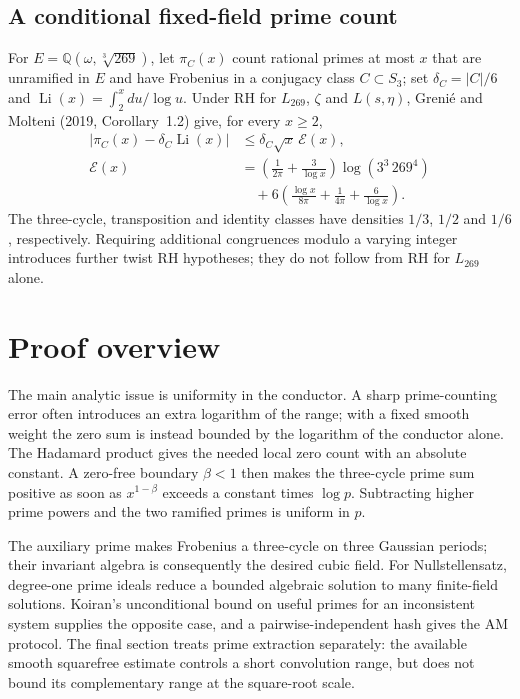\documentclass[11pt]{article}
\newcommand{\Q}{\mathbb Q}
\newcommand{\Li}{\operatorname{Li}}
\begin{document}
\subsection*{A conditional fixed-field prime count}
For $E=\Q(\omega,\sqrt[3]{269})$, let $\pi_C(x)$ count
rational primes at most $x$ that are unramified in $E$ and have
Frobenius in a conjugacy class $C\subset S_3$; set
$\delta_C=|C|/6$ and $\Li(x)=\int_2^xdu/\log u$.
Under RH for $L_{269}$, $\zeta$ and $L(s,\eta)$,
Greni\'e and Molteni (2019, Corollary~1.2) give, for every $x\ge2$,
\begin{align*}
 |\pi_C(x)-\delta_C\Li(x)|&\le\delta_C\sqrt x\,\mathcal E(x),\\
 \mathcal E(x)&=
 \left(\frac1{2\pi}+\frac3{\log x}\right)\log(3^3\,269^4)\\
 &\quad+6\left(\frac{\log x}{8\pi}+\frac1{4\pi}+\frac6{\log x}\right).
\end{align*}
The three-cycle, transposition and identity classes have densities
$1/3$, $1/2$ and $1/6$, respectively. Requiring additional congruences
modulo a varying integer introduces further twist RH hypotheses;
they do not follow from RH for $L_{269}$ alone.

\section*{Proof overview}
The main analytic issue is uniformity in the conductor. A sharp
prime-counting error often introduces an extra logarithm of the range;
with a fixed smooth weight the zero sum is instead bounded by the
logarithm of the conductor alone. The Hadamard product gives the needed
local zero count with an absolute constant. A zero-free boundary
$\beta<1$ then makes the three-cycle prime sum positive as soon as
$x^{1-\beta}$ exceeds a constant times $\log p$.
Subtracting higher prime powers and the two ramified primes is
uniform in $p$.

The auxiliary prime makes Frobenius a three-cycle on three Gaussian
periods; their invariant algebra is consequently the desired cubic
field. For Nullstellensatz, degree-one prime ideals reduce a bounded
algebraic solution to many finite-field solutions. Koiran's unconditional
bound on useful primes for an inconsistent system supplies the opposite
case, and a pairwise-independent hash gives the AM protocol.
The final section treats prime extraction separately: the available
smooth squarefree estimate controls a short convolution range, but
does not bound its complementary range at the square-root scale.
\end{document}
